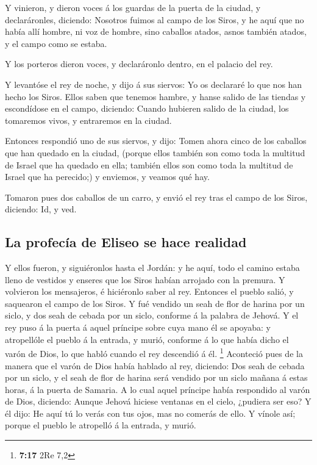  Y vinieron, y dieron voces á los guardas de la puerta de
la ciudad, y declaráronles, diciendo: Nosotros fuimos al campo de los
Siros, y he aquí que no había allí hombre, ni voz de hombre, sino
caballos atados, asnos también atados, y el campo como se estaba.

 Y los porteros dieron voces, y declaráronlo dentro, en el
palacio del rey.

 Y levantóse el rey de noche, y dijo á sus siervos: Yo os
declararé lo que nos han hecho los Siros. Ellos saben que tenemos
hambre, y hanse salido de las tiendas y escondídose en el campo,
diciendo: Cuando hubieren salido de la ciudad, los tomaremos vivos, y
entraremos en la ciudad.

 Entonces respondió uno de sus siervos, y dijo: Tomen ahora
cinco de los caballos que han quedado en la ciudad, (porque ellos
también son como toda la multitud de Israel que ha quedado en ella;
también ellos son como toda la multitud de Israel que ha perecido;) y
enviemos, y veamos qué hay.

 Tomaron pues dos caballos de un carro, y envió el rey tras
el campo de los Siros, diciendo: Id, y ved.

\hypertarget{la-profecuxeda-de-eliseo-se-hace-realidad}{%
\subsection{La profecía de Eliseo se hace
realidad}\label{la-profecuxeda-de-eliseo-se-hace-realidad}}

 Y ellos fueron, y siguiéronlos hasta el Jordán: y he aquí,
todo el camino estaba lleno de vestidos y enseres que los Siros habían
arrojado con la premura. Y volvieron los mensajeros, é hiciéronlo saber
al rey.  Entonces el pueblo salió, y saquearon el campo de
los Siros. Y fué vendido un seah de flor de harina por un siclo, y dos
seah de cebada por un siclo, conforme á la palabra de Jehová.
 Y el rey puso á la puerta á aquel príncipe sobre cuya mano
él se apoyaba: y atropellóle el pueblo á la entrada, y murió, conforme á
lo que había dicho el varón de Dios, lo que habló cuando el rey
descendió á él. \footnote{\textbf{7:17} 2Re 7,2}  Aconteció
pues de la manera que el varón de Dios había hablado al rey, diciendo:
Dos seah de cebada por un siclo, y el seah de flor de harina será
vendido por un siclo mañana á estas horas, á la puerta de Samaria.
 A lo cual aquel príncipe había respondido al varón de
Dios, diciendo: Aunque Jehová hiciese ventanas en el cielo, ¿pudiera ser
eso? Y él dijo: He aquí tú lo verás con tus ojos, mas no comerás de
ello.  Y vínole así; porque el pueblo le atropelló á la
entrada, y murió.

